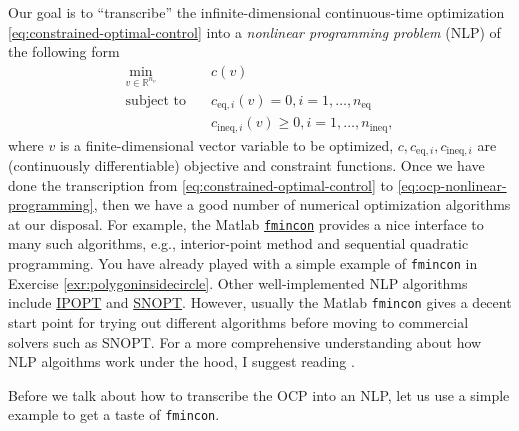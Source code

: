 \documentclass[
]{book}
\theoremstyle{definition}
\theoremstyle{definition}
\theoremstyle{definition}
\theoremstyle{definition}
\theoremstyle{remark}
\begin{document}
Our goal is to ``transcribe'' the infinite-dimensional continuous-time optimization \eqref{eq:constrained-optimal-control} into a \emph{nonlinear programming problem} (NLP) of the following form
\begin{equation}
\begin{split}
\min_{v \in \mathbb{R}^{n_v}} & \quad c(v) \\
\text{subject to} & \quad c_{\text{eq},i}(v) = 0, i =1,\dots, n_{\text{eq}} \\
& \quad c_{\text{ineq},i}(v) \geq 0, i=1,\dots,n_{\text{ineq}},
\end{split}
\label{eq:ocp-nonlinear-programming}
\end{equation}
where \(v\) is a finite-dimensional vector variable to be optimized, \(c, c_{\text{eq},i}, c_{\text{ineq},i}\) are (continuously differentiable) objective and constraint functions. Once we have done the transcription from \eqref{eq:constrained-optimal-control} to \eqref{eq:ocp-nonlinear-programming}, then we have a good number of numerical optimization algorithms at our disposal. For example, the Matlab \href{https://www.mathworks.com/help/optim/ug/fmincon.html}{\texttt{fmincon}} provides a nice interface to many such algorithms, e.g., interior-point method and sequential quadratic programming. You have already played with a simple example of \texttt{fmincon} in Exercise \ref{exr:polygoninsidecircle}. Other well-implemented NLP algorithms include \href{https://github.com/coin-or/Ipopt}{IPOPT} and \href{http://www.sbsi-sol-optimize.com/asp/sol_product_snopt.htm}{SNOPT}. However, usually the Matlab \texttt{fmincon} gives a decent start point for trying out different algorithms before moving to commercial solvers such as SNOPT. For a more comprehensive understanding about how NLP algoithms work under the hood, I suggest reading \citep{nocedal99book-numerical}.

Before we talk about how to transcribe the OCP into an NLP, let us use a simple example to get a taste of \texttt{fmincon}.
\end{document}
